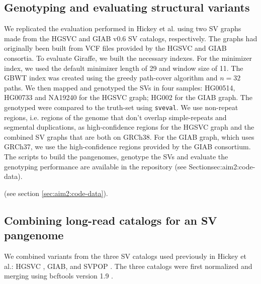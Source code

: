 \documentclass[11pt]{ucscthesis}
\begin{document}
\subsection{Genotyping and evaluating structural variants}
\label{subsec:aim2:svgenotyping}

We replicated the evaluation performed in Hickey et al.\cite{hickey_vgsv_2020} using two SV graphs made from the HGSVC\cite{chaisson_sv_2019} and GIAB v0.6\cite{zook_robust_2020} SV catalogs, respectively.
The graphs had originally been built from VCF files provided by the HGSVC and GIAB consortia.
To evaluate Giraffe, we built the necessary indexes.
For the minimizer index, we used the default minimizer length of 29 and window size of 11.
The GBWT index was created using the greedy path-cover algorithm and $n = 32$ paths.
We then mapped and genotyped the SVs in four samples: HG00514, HG00733 and NA19240 for the HGSVC graph; HG002 for the GIAB graph.
The genotyped were compared to the truth-set using \texttt{sveval}\cite{hickey_vgsv_2020}.
We use non-repeat regions, i.e. regions of the genome that don't overlap simple-repeats and segmental duplications, as high-confidence regions for the HGSVC graph and the combined SV graphs that are both on GRCh38.
For the GIAB graph, which uses GRCh37, we use the high-confidence regions provided by the GIAB consortium\cite{zook_robust_2020}.
The scripts to build the pangenomes, genotype the SVs and evaluate the genotyping performance are available in the repository (see Section{sec:aim2:code-data}).

(see section \ref{sec:aim2:code-data}).

\subsection{Combining long-read catalogs for an SV pangenome}
\label{subsec:svpangenome}

We combined variants from the three SV catalogs used previously in Hickey et al.\cite{hickey_vgsv_2020}: HGSVC \cite{chaisson_sv_2019}, GIAB\cite{zook_robust_2020}, and SVPOP \cite{audano_hgsvc}.
The three catalogs were first normalized and merging using bcftools version 1.9 \cite{li_samtools_2011}.
\end{document}
